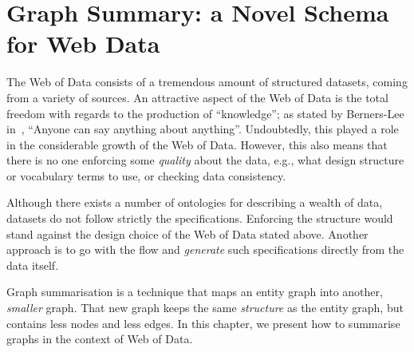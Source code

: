 \chapter{Graph Summary: a Novel Schema for Web Data}
\label{chap:summary}

The Web of Data consists of a tremendous amount of structured datasets, coming from a variety of sources. An attractive aspect of the Web of Data is the total freedom with regards to the production of ``knowledge''; as stated by Berners-Lee in~\cite{tbl:1997:wam}, ``Anyone can say anything about anything''. Undoubtedly, this played a role in the considerable growth of the Web of Data. However, this also means that there is no one enforcing some \emph{quality} about the data, e.g., what design structure or vocabulary terms to use, or checking data consistency.

Although there exists a number of ontologies for describing a wealth of data, datasets do not follow strictly the specifications. Enforcing the structure would stand against the design choice of the Web of Data stated above. Another approach is to go with the flow and \emph{generate} such specifications directly from the data itself.

Graph summarisation is a technique that maps an entity graph into another, \emph{smaller} graph. That new graph keeps the same \emph{structure} as the entity graph, but contains less nodes and less edges. %
In this chapter, we present how to summarise graphs in the context of Web of Data.
